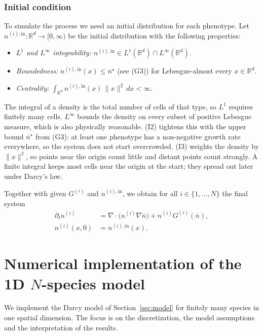 \documentclass[11pt]{article}
\newcommand{\nin}{n^{(i),\mathrm{in}}}
\newcommand{\nbar}{\overline{n}}
\begin{document}
\subsubsection{Initial condition}
\label{sec:initial}
To simulate the process we need an initial distribution for each phenotype. Let
$\nin \colon \mathbb{R}^d \to [0, \infty)$ be the initial distribution with the
following properties:
\begin{itemize}
    \item[(I1)] \emph{$L^1$ and $L^\infty$ integrability:} $\nin \in
    L^1(\mathbb{R}^d) \cap L^\infty(\mathbb{R}^d)$.
    \item[(I2)] \emph{Boundedness:} $\nin(x) \le \nbar^{\star}$ (see (G3)) for
    Lebesgue-almost every $x \in \mathbb{R}^d$.
    \item[(I3)] \emph{Centrality:} $\int_{\mathbb{R}^d} \nin(x)\, \lVert x
    \rVert^2 \, dx < \infty$.
\end{itemize}
The integral of a density is the total number of cells of that type, so $L^1$
requires finitely many cells. $L^\infty$ bounds the density on every subset of
positive Lebesgue measure, which is also physically reasonable. (I2) tightens this
with the upper bound $\nbar^{\star}$ from (G3): at least one phenotype has a
non-negative growth rate everywhere, so the system does not start overcrowded.
(I3) weights the density by $\lVert x \rVert^2$, so points near the origin count
little and distant points count strongly. A finite integral keeps most cells near
the origin at the start; they spread out later under Darcy's law.

Together with given $G^{(i)}$ and $\nin$, we obtain for all $i \in \{1, \dots,
N\}$ the final system
\begin{equation}
    \begin{aligned}
        \partial_t n^{(i)} &= \nabla \cdot \bigl( n^{(i)} \nabla \nbar \bigr)
        + n^{(i)} G^{(i)}(\nbar), \\
        n^{(i)}(x, 0) &= \nin(x).
    \end{aligned}
\end{equation}

\section{Numerical implementation of the 1D $N$-species model}
\label{sec:1d}
We implement the Darcy model of Section~\ref{sec:model} for finitely many species
in one spatial dimension. The focus is on the discretization, the model
assumptions and the interpretation of the results.
\end{document}
